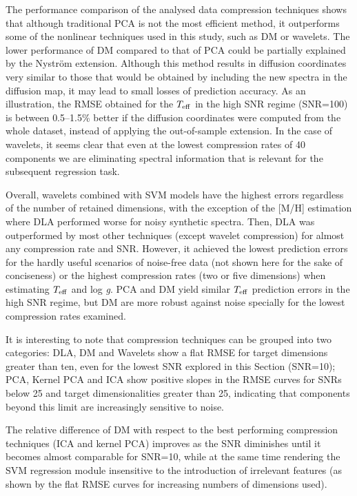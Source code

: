 \documentclass[a4paper,fleqn,usenatbib]{mnras}
\begin{document}
{The performance comparison of the analysed data compression
techniques shows that although traditional PCA is not the most
efficient method, it outperforms some of the nonlinear techniques used
in this study, such as DM or wavelets. %
The lower performance of DM compared to that of PCA  could be partially explained by the 
Nystr\"{o}m extension. Although this method results in diffusion coordinates 
very similar to those that would be obtained by including the new spectra in 
the diffusion map, it may lead to small losses of 
prediction accuracy. As an illustration, the RMSE obtained for the 
$T_{\rm eff}$ in the high SNR regime (SNR=100) is between {0.5}--{1.5}\% 
better if the diffusion coordinates were computed 
from the whole dataset, instead of applying the out-of-sample extension.
In the case of wavelets, it seems clear that even at the lowest 
compression rates of 40 components we are eliminating
spectral information that is relevant for the subsequent regression task. 

Overall, wavelets combined with SVM models have the highest errors
regardless of the number of retained dimensions, with the exception of
the [M/H] estimation where DLA performed worse for noisy synthetic
spectra. Then, DLA was outperformed by most other techniques (except wavelet 
compression) for almost any compression rate and SNR. However, 
it achieved the lowest prediction errors for the hardly useful scenarios of noise-free data 
(not shown here for the sake of conciseness) or the highest compression 
rates (two or five dimensions) when estimating $T_{\rm eff}$ and 
log \textit{g}. PCA and DM yield similar $T_{\rm eff}$ prediction
errors in the high SNR regime, but DM are more robust against noise
specially for the lowest compression rates examined.

It is interesting to note that compression techniques can be grouped
into two categories: DLA, DM and Wavelets show a flat RMSE for target
dimensions greater than ten, even for the lowest SNR explored in this
Section (SNR=10); PCA, Kernel PCA and ICA show positive slopes in the
RMSE curves for SNRs below 25 and target dimensionalities greater than
25, indicating that components beyond this limit are increasingly
sensitive to noise. 

The relative difference of DM with respect to the best
performing compression techniques (ICA and kernel PCA) improves as the
SNR diminishes until it becomes almost comparable for SNR=10, while at
the same time rendering the SVM regression module insensitive to the
introduction of irrelevant features (as shown by the flat RMSE curves
for increasing numbers of dimensions used). 

}
\end{document}
